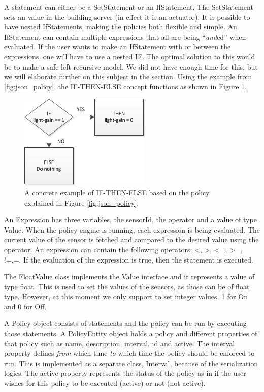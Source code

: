 A statement can either be a SetStatement or an IfStatement. The SetStatement sets an value in the building server (in effect it is an actuator). It is possible to have nested IfStatements, making the policies both flexible and simple. An IfStatement can contain multiple expressions that all are being ``\textit{and}ed'' when evaluated. If the user wants to make an IfStatement with or between the expressions, one will have to use a nested IF. The optimal solution to this would be to make a safe left-recursive model. We did not have enough time for this, but we will elaborate further on this subject in the  section. 
Using the example from \ref{fig:json_policy}, the IF-THEN-ELSE concept functions as shown in Figure \ref{fig:if-then-else_example}.
\begin{figure}
	\centering
    \includegraphics[scale=0.55]{images/IF-THEN-ELSE_example.png} 
	\caption{A concrete example of IF-THEN-ELSE based on the policy explained in Figure \ref{fig:json_policy}.}
	\label{fig:if-then-else_example}
\end{figure}

An Expression has three variables, the sensorId, the operator and a value of type Value. When the policy engine is running, each expression is being evaluated. The current value of the sensor is fetched and compared to the desired value using the operator. An expression can contain the following operators; <, >, <=, >=, !=,=. 
If the evaluation of the expression is true, then the statement is executed.

The FloatValue class implements the Value interface and it represents a value of type float. This is used to set the values of the sensors, as those can be of float type. However, at this moment we only support to set integer values, 1 for On and 0 for Off.

A Policy object consists of statements and the policy can be run by executing those statements. A PolicyEntity object holds a policy and different properties of that policy such as name, description, interval, id and active. The interval property defines \textit{from} which time \textit{to} which time the policy should be enforced to run. This is implemented as a separate class, Interval, because of the serialization logics. The active property represents the status of the policy as in if the user wishes for this policy to be executed (active) or not (not active).


